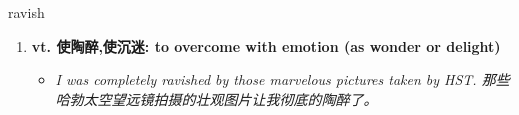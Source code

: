 
\begin{frame}
{\huge ravish}
\begin{center}
\begin{enumerate}\Large
  \item \textbf{vt. 使陶醉,使沉迷: to overcome with emotion (as wonder or delight)}
  \begin{itemize}
    \item \em{\Large{I was completely ravished by those marvelous pictures taken by HST. 那些哈勃太空望远镜拍摄的壮观图片让我彻底的陶醉了。}}
  \end{itemize}
\end{enumerate}
\end{center}
\end{frame}

